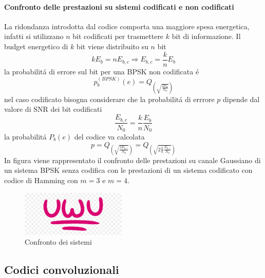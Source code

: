             \paragraph{Confronto delle prestazioni su sistemi codificati e non codificati}
                La ridondanza introdotta dal codice comporta una maggiore spesa energetica, infatti si utilizzano $n$ bit codificati 
                per trasmettere $k$ bit di informazione. Il budget energetico di $k$ bit viene distribuito su $n$ bit 
                \[
                    kE_b = nE_{b,c}\Rightarrow E_{b,c} = \frac{k}{n}E_b 
                \]
                la probabilitá di errore sul bit per una BPSK non codificata é 
                \[
                    p_b^{(BPSK)}(e) = Q_{\left(\sqrt{\frac{2E_b}{N_0}}\right)}  
                \]
                nel caso codificato bisogna considerare che la probabilitá di errrore $p$ dipende dal valore di SNR dei bit codificati
                \[
                    \frac{E_{b,c}}{N_0} = \frac{k}{n} \frac{E_b}{N_0}    
                \]
                la probabilitá $P_b(e)$ del codice va calcolata 
                \[
                    p = Q_{\left(\sqrt{\frac{2E_{b,c}}{N_0}}\right)} = Q_{\left(\sqrt{2\frac{k}{n}\frac{E_{b,c}}{N_0}}\right)} 
                \]
                In figura viene rappresentato il confronto delle prestazioni su canale Gaussiano di un sistema BPSK senza codifica
                con le prestazioni di un sistema codificato con codice di Hamming con $m=3$ e $m=4$.
                \begin{figure}[H]
                    \centering
                    \includegraphics[width = 5cm]{media/uwu.png}
                    \caption{Confronto dei sistemi}
                \end{figure}
        \subsection{Codici convoluzionali}
